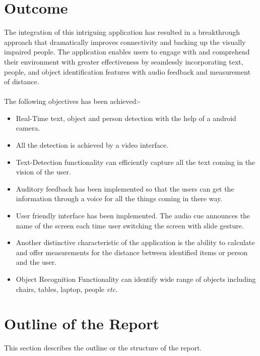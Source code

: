 \documentclass[MScCS]{uccthesis}
\begin{document}
   \section{Outcome}
   The integration of this intriguing application has resulted in a breakthrough approach that dramatically improves connectivity and backing up the visually impaired people. The application enables users to engage with and comprehend their environment with greater effectiveness by seamlessly incorporating text, people, and object identification features with audio feedback and measurement of distance.\\
   \\The following objectives has been achieved:-
   \begin{itemize}
       \item Real-Time text, object and person detection with the help of a android camera.
       \item All the detection is achieved by a video interface.
       \item Text-Detection functionality can efficiently capture all the text coming in the vision of the user.
       \item Auditory feedback has been implemented so that the users can get the information through a voice for all the things coming in there way.
       \item User friendly interface has been implemented. The audio cue announces the name of the screen each time user switching the screen with slide gesture.
       \item Another distinctive characteristic of the application is the ability to calculate and offer measurements for the distance between identified items or person and the user. 
       \item Object Recognition Functionality can identify wide range of objects including chairs, tables, laptop, people \textit{etc.}
   \end{itemize}
\newpage


   \section{Outline of the Report}

   This section describes the outline or the structure of the report.
\end{document}
